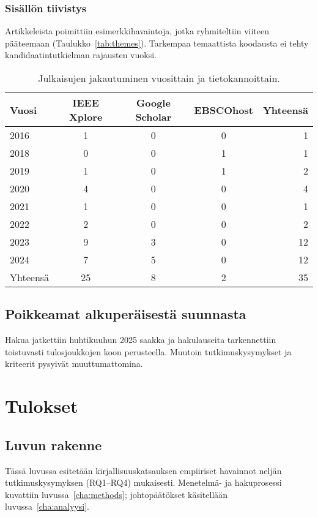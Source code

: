 \documentclass[bscthesis,finnish,oneside,biblatex]{uefcsthesis}
\begin{document}
\subsection{Sisällön tiivistys}
Artikkeleista poimittiin esimerkkihavaintoja, jotka ryhmiteltiin
viiteen pääteemaan (Taulukko~\ref{tab:themes}).
Tarkempaa temaattista koodausta ei tehty kandidaatintutkielman
rajausten vuoksi.

\begin{table}[htbp]
  \centering
  \footnotesize
  \caption{Julkaisujen jakautuminen vuosittain ja tietokannoittain.}
  \label{tab:descriptive}
  \begin{tabular}{lcccr}
    \toprule
    \textbf{Vuosi} & \textbf{IEEE Xplore} & \textbf{Google Scholar} & \textbf{EBSCOhost} & \textbf{Yhteensä} \\
    \midrule
    2016 & 1 & 0 & 0 & 1  \\
    2018 & 0 & 0 & 1 & 1  \\
    2019 & 1 & 0 & 1 & 2  \\
    2020 & 4 & 0 & 0 & 4  \\
    2021 & 1 & 0 & 0 & 1  \\
    2022 & 2 & 0 & 0 & 2  \\
    2023 & 9 & 3 & 0 & 12 \\
    2024 & 7 & 5 & 0 & 12 \\
    \midrule
    Yhteensä & 25 & 8 & 2 & 35\\
    \bottomrule
  \end{tabular}
\end{table}

\section{Poikkeamat alkuperäisestä suunnasta}
\label{sec:deviations}

Hakua jatkettiin huhtikuuhun 2025 saakka ja
hakulauseita tarkennettiin toistuvasti tulosjoukkojen koon perusteella.
Muutoin tutkimuskysymykset ja kriteerit pysyivät muuttumattomina.


\chapter{Tulokset}
\label{cha:tulokset}

\section*{Luvun rakenne}
Tässä luvussa esitetään kirjallisuuskatsauksen empiiriset havainnot
neljän tutkimuskysymyksen (RQ1–RQ4) mukaisesti.  Menetelmä- ja
hakuprosessi kuvattiin luvussa~\ref{cha:methods}; johtopäätökset
käsitellään luvussa~\ref{cha:analyysi}.
\end{document}
